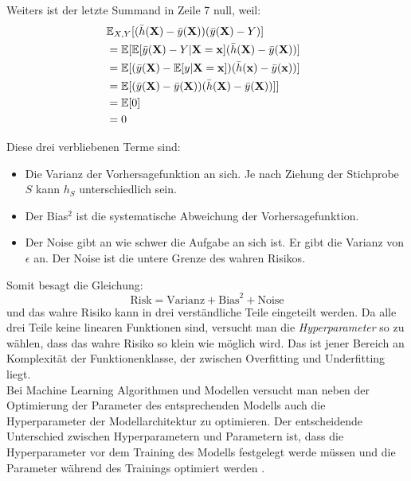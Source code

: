 Weiters ist der letzte Summand in Zeile 7 null, weil:
\begin{equation*}
	\begin{split}
		\lefteqn{ \mathbb{E}_{X, Y}[(\bar{h}(\mathbf{X})-\bar{y}(\mathbf{X}))(\bar{y}(\mathbf{X})-Y)] } \\\
		& = \mathbb{E}[\mathbb{E}[\bar{y}(\mathbf{X})-Y|\mathbf{X} = \mathbf{x}](\bar{h}(\mathbf{X})-\bar{y}(\mathbf{X}))] \\\
		& = \mathbb{E}[(\bar{y}(\mathbf{X})-\mathbb{E}[y|\mathbf{X} = \mathbf{x}])(\bar{h}(\mathbf{x})-\bar{y}(\mathbf{x}))] \\\
		& = \mathbb{E}[(\bar{y}(\mathbf{X})-\bar{y}(\mathbf{X}))(\bar{h}(\mathbf{X})-\bar{y}(\mathbf{X}))]] \\\
		& = \mathbb{E}[0]\\\
		& = 0
	\end{split}
\end{equation*}


Diese drei verbliebenen Terme sind:
\begin{itemize}
	\item Die Varianz der Vorhersagefunktion an sich. Je nach Ziehung der Stichprobe $S$ kann $h_S$ unterschiedlich sein.
	\item Der Bias$^2$ ist die systematische Abweichung der Vorhersagefunktion. %
	\item Der Noise gibt an wie schwer die Aufgabe an sich ist. Er gibt die Varianz von $\epsilon$ an. Der Noise ist die untere Grenze des wahren Risikos.
\end{itemize}

Somit besagt die Gleichung:
$$ \text{Risk} = \text{Varianz} + \text{Bias}^2 + \text{Noise} $$
und das wahre Risiko kann in drei verst\"andliche Teile eingeteilt werden. Da alle drei Teile keine linearen Funktionen sind,
versucht man die \textit{Hyperparameter} so zu w\"ahlen, dass das wahre Risiko so klein wie
m\"oglich wird. Das ist jener Bereich an Komplexit\"at der Funktionenklasse, der zwischen Overfitting und Underfitting liegt. \\


Bei Machine Learning Algorithmen und Modellen versucht man neben der Optimierung der Parameter des entsprechenden Modells
auch die Hyperparameter der Modellarchitektur zu optimieren. Der entscheidende Unterschied zwischen Hyperparametern
und Parametern ist, dass die Hyperparameter vor dem Training des Modells festgelegt werde m\"ussen und die Parameter w\"ahrend des Trainings
optimiert werden \cite{hyper}. \\

